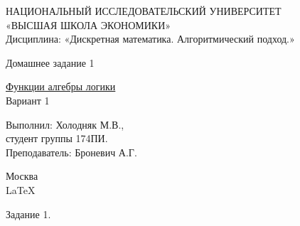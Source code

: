 \documentclass[a4paper,12pt]{report} %
\begin{document}
\begin{titlepage}
\newpage

\begin{center}
{\large НАЦИОНАЛЬНЫЙ ИССЛЕДОВАТЕЛЬСКИЙ УНИВЕРСИТЕТ \\
«ВЫСШАЯ ШКОЛА ЭКОНОМИКИ» 							\\
Дисциплина: «Дискретная математика. Алгоритмический подход.»}

\vfill %

{\large Домашнее задание 1}

\bigskip


{\large \underline{Функции алгебры логики}}\\
Вариант 1

\vfill

\begin{flushright}
Выполнил: Холодняк М.В.,\\
студент группы 174ПИ.\medskip \\
Преподаватель: Броневич А.Г.
\end{flushright}

\vfill

Москва \number\year \\
\LaTeX

\end{center}
\end{titlepage}

\newpage

\begin{center}
Задание 1.\\
\end{center}
\end{document}
